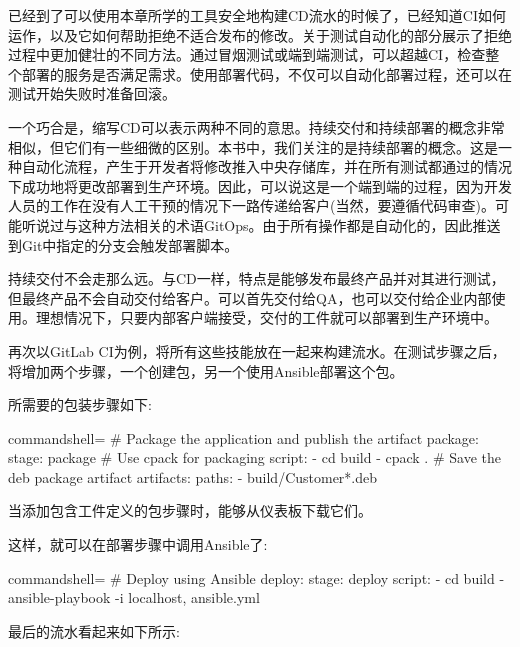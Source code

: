 
已经到了可以使用本章所学的工具安全地构建CD流水的时候了，已经知道CI如何运作，以及它如何帮助拒绝不适合发布的修改。关于测试自动化的部分展示了拒绝过程中更加健壮的不同方法。通过冒烟测试或端到端测试，可以超越CI，检查整个部署的服务是否满足需求。使用部署代码，不仅可以自动化部署过程，还可以在测试开始失败时准备回滚。


一个巧合是，缩写CD可以表示两种不同的意思。持续交付和持续部署的概念非常相似，但它们有一些细微的区别。本书中，我们关注的是持续部署的概念。这是一种自动化流程，产生于开发者将修改推入中央存储库，并在所有测试都通过的情况下成功地将更改部署到生产环境。因此，可以说这是一个端到端的过程，因为开发人员的工作在没有人工干预的情况下一路传递给客户(当然，要遵循代码审查)。可能听说过与这种方法相关的术语GitOps。由于所有操作都是自动化的，因此推送到Git中指定的分支会触发部署脚本。

持续交付不会走那么远。与CD一样，特点是能够发布最终产品并对其进行测试，但最终产品不会自动交付给客户。可以首先交付给QA，也可以交付给企业内部使用。理想情况下，只要内部客户端接受，交付的工件就可以部署到生产环境中。


再次以GitLab CI为例，将所有这些技能放在一起来构建流水。在测试步骤之后，将增加两个步骤，一个创建包，另一个使用Ansible部署这个包。

所需要的包装步骤如下:

\begin{tcblisting}{commandshell={}}
# Package the application and publish the artifact
package:
  stage: package
  # Use cpack for packaging
  script:
    - cd build
    - cpack .
  # Save the deb package artifact
  artifacts:
    paths:
      - build/Customer*.deb
\end{tcblisting}

当添加包含工件定义的包步骤时，能够从仪表板下载它们。

这样，就可以在部署步骤中调用Ansible了:

\begin{tcblisting}{commandshell={}}
# Deploy using Ansible
deploy:
  stage: deploy
  script:
    - cd build
    - ansible-playbook -i localhost, ansible.yml
\end{tcblisting}

最后的流水看起来如下所示:

